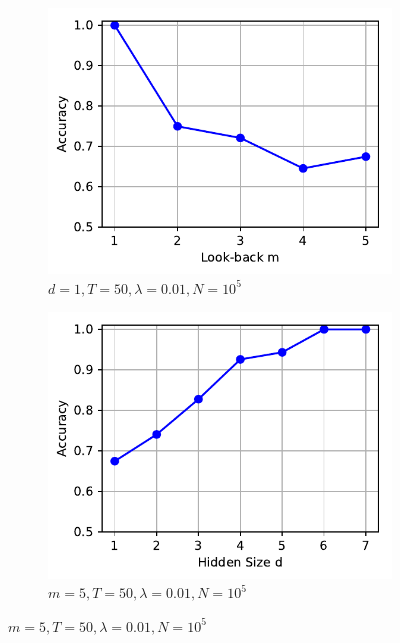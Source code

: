 	
	\begin{figure}
		\centering
		\begin{subfigure}[b]{0.5\linewidth}
			\centering
			\includegraphics[width=\linewidth]{Images/Python-Plots/accuracy-vs-look-back}
			\caption{
				$d = 1, T = 50, \lambda = 0.01, N = 10^5$
				\label{fig:accuracy-vs-look-back}
			}
		\end{subfigure}%
		\begin{subfigure}[b]{0.5\linewidth}
			\includegraphics[width=\linewidth]{Images/Python-Plots/accuracy-vs-hidden-size}
			\caption{
				$m = 5, T = 50, \lambda = 0.01, N = 10^5$
				\label{fig:accuracy-vs-hidden-size}
			}
		\end{subfigure}

\end{figure}
